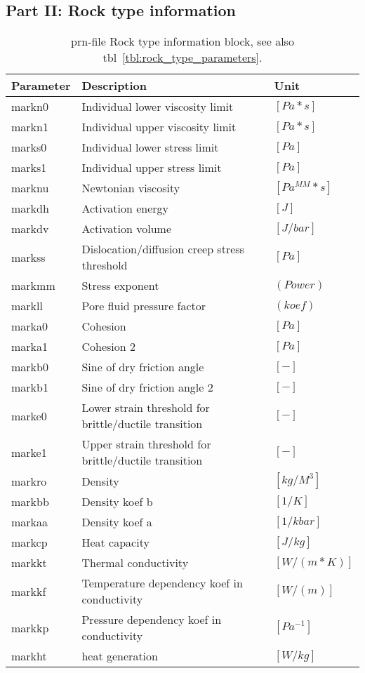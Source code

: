 \subsection{Part II: Rock type information
}
\begin{table}[H]
\small
\centering
\begin{tabular}{l p{8cm} l}
\toprule
Parameter & Description & Unit\\
\midrule
markn0 & Individual lower viscosity limit & $[Pa*s]$ \\ 
markn1 & Individual upper viscosity limit & $[Pa*s]$ \\ 
marks0 & Individual lower stress limit & $[Pa]$ \\ 
marks1 & Individual upper stress limit & $[Pa]$ \\ 
marknu & Newtonian viscosity & $[Pa^{MM}*s]$ \\ 
markdh & Activation energy & $[J]$\\ 
markdv & Activation volume & $[J/bar]$ \\ 
markss & Dislocation/diffusion creep stress threshold& $[Pa]$ \\ 
markmm & Stress exponent & $(Power)$ \\ 
markll & Pore fluid pressure factor & $(koef)$ \\ 
marka0 & Cohesion & $[Pa]$ \\
marka1 & Cohesion 2 & $[Pa]$ \\
markb0 & Sine of dry friction angle & $[-]$ \\
markb1 & Sine of dry friction angle 2 & $[-]$ \\
marke0 & Lower strain threshold for brittle/ductile transition & $[-]$ \\
marke1 & Upper strain threshold for brittle/ductile transition & $[-]$ \\ 
markro & Density & $[kg/M^3]$ \\ 
markbb & Density koef b & $[1/K]$ \\ 
markaa & Density koef a & $[1/kbar]$\\ 
markcp & Heat capacity  & $[J/kg]$ \\ 
markkt & Thermal conductivity & $[W/(m*K)]$ \\ 
markkf & Temperature dependency koef in conductivity & $[W/(m)]$ \\ 
markkp & Pressure dependency koef in conductivity & $[Pa^{-1}]$ \\ 
markht & heat generation & $[W/kg]$\\ 
\bottomrule
\end{tabular}
\caption{prn-file Rock type information block, see also tbl~\ref{tbl:rock_type_parameters}.}
\label{tbl:prn_rock_type_info}
\end{table}


